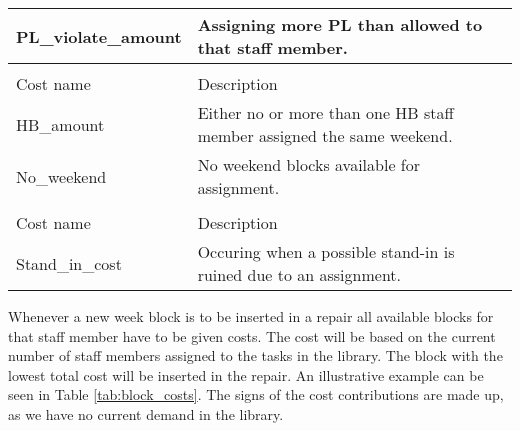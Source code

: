 \begin{table}[!h]
\begin{tabular}{|l|l|}
PL\_violate\_amount             & Assigning more PL than allowed to that staff member.                  \\ \hline
\rowcolor[HTML]{FD6864} 
\multicolumn{2}{|l|}{\cellcolor{corn} \textbf{Weekend costs}} \\ \hline
\rowcolor[HTML]{C0C0C0} 
Cost name                                      & Description       \\ \hline
HB\_amount                       & Either no or more than one HB staff member assigned the same weekend.   \\ \hline
No\_weekend                & No weekend blocks available for assignment.                  \\ \hline
\rowcolor[HTML]{FD6864} 
\multicolumn{2}{|l|}{\cellcolor{corn} \textbf{Stand-in costs}} \\ \hline
\rowcolor[HTML]{C0C0C0} 
Cost name                                      & Description       \\ \hline
Stand\_in\_cost                     & Occuring when a possible stand-in is ruined due to an assignment.    \\ \hline
\end{tabular}
\end{table}

Whenever a new week block is to be inserted in a repair all available blocks for that staff member have to be given costs. The cost will be based on the current number of staff members assigned to the tasks in the library. The block with the lowest total cost will be inserted in the repair. An illustrative example can be seen in Table \ref{tab:block_costs}. The signs of the cost contributions are made up, as we have no current demand in the library.

